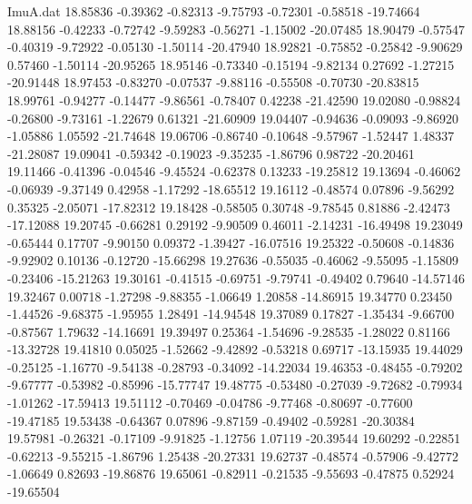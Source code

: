 \begin{filecontents}{ImuA.dat}
  18.85836   -0.39362   -0.82313   -9.75793   -0.72301   -0.58518  -19.74664
  18.88156   -0.42233   -0.72742   -9.59283   -0.56271   -1.15002  -20.07485
  18.90479   -0.57547   -0.40319   -9.72922   -0.05130   -1.50114  -20.47940
  18.92821   -0.75852   -0.25842   -9.90629    0.57460   -1.50114  -20.95265
  18.95146   -0.73340   -0.15194   -9.82134    0.27692   -1.27215  -20.91448
  18.97453   -0.83270   -0.07537   -9.88116   -0.55508   -0.70730  -20.83815
  18.99761   -0.94277   -0.14477   -9.86561   -0.78407    0.42238  -21.42590
  19.02080   -0.98824   -0.26800   -9.73161   -1.22679    0.61321  -21.60909
  19.04407   -0.94636   -0.09093   -9.86920   -1.05886    1.05592  -21.74648
  19.06706   -0.86740   -0.10648   -9.57967   -1.52447    1.48337  -21.28087
  19.09041   -0.59342   -0.19023   -9.35235   -1.86796    0.98722  -20.20461
  19.11466   -0.41396   -0.04546   -9.45524   -0.62378    0.13233  -19.25812
  19.13694   -0.46062   -0.06939   -9.37149    0.42958   -1.17292  -18.65512
  19.16112   -0.48574    0.07896   -9.56292    0.35325   -2.05071  -17.82312
  19.18428   -0.58505    0.30748   -9.78545    0.81886   -2.42473  -17.12088
  19.20745   -0.66281    0.29192   -9.90509    0.46011   -2.14231  -16.49498
  19.23049   -0.65444    0.17707   -9.90150    0.09372   -1.39427  -16.07516
  19.25322   -0.50608   -0.14836   -9.92902    0.10136   -0.12720  -15.66298
  19.27636   -0.55035   -0.46062   -9.55095   -1.15809   -0.23406  -15.21263
  19.30161   -0.41515   -0.69751   -9.79741   -0.49402    0.79640  -14.57146
  19.32467    0.00718   -1.27298   -9.88355   -1.06649    1.20858  -14.86915
  19.34770    0.23450   -1.44526   -9.68375   -1.95955    1.28491  -14.94548
  19.37089    0.17827   -1.35434   -9.66700   -0.87567    1.79632  -14.16691
  19.39497    0.25364   -1.54696   -9.28535   -1.28022    0.81166  -13.32728
  19.41810    0.05025   -1.52662   -9.42892   -0.53218    0.69717  -13.15935
  19.44029   -0.25125   -1.16770   -9.54138   -0.28793   -0.34092  -14.22034
  19.46353   -0.48455   -0.79202   -9.67777   -0.53982   -0.85996  -15.77747
  19.48775   -0.53480   -0.27039   -9.72682   -0.79934   -1.01262  -17.59413
  19.51112   -0.70469   -0.04786   -9.77468   -0.80697   -0.77600  -19.47185
  19.53438   -0.64367    0.07896   -9.87159   -0.49402   -0.59281  -20.30384
  19.57981   -0.26321   -0.17109   -9.91825   -1.12756    1.07119  -20.39544
  19.60292   -0.22851   -0.62213   -9.55215   -1.86796    1.25438  -20.27331
  19.62737   -0.48574   -0.57906   -9.42772   -1.06649    0.82693  -19.86876
  19.65061   -0.82911   -0.21535   -9.55693   -0.47875    0.52924  -19.65504

\end{filecontents}
